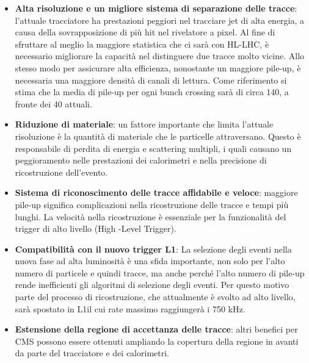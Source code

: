 \begin{itemize}
\item \textbf{Alta risoluzione e un migliore sistema di separazione delle tracce}: l'attuale tracciatore ha prestazioni peggiori nel tracciare jet di alta energia, a causa della sovrapposizione di più hit nel rivelatore a pixel. Al fine di sfruttare al meglio la maggiore statistica che ci sarà con HL-LHC, è necessario migliorare la capacità nel distinguere due tracce molto vicine. 
Allo stesso modo  per assicurare alta efficienza, nonostante un maggiore pile-up, è necessaria una maggiore densità di canali di lettura. Come riferimento si stima che la media di pile-up per ogni bunch crossing sarà di circa 140, a fronte dei 40 attuali.

\item \textbf{Riduzione di materiale}: un fattore importante che limita l'attuale risoluzione  è la quantità di materiale che le particelle attraversano. Questo è responsabile di perdita di energia e scattering multipli, i quali causano un peggioramento nelle prestazioni dei calorimetri e nella precisione di ricostruzione dell'evento.

\item \textbf{Sistema di riconoscimento delle tracce affidabile e veloce}: maggiore pile-up significa complicazioni nella ricostruzione delle tracce e tempi più lunghi. La velocità nella ricostruzione è essenziale per la funzionalità del trigger di alto livello (High -Level Trigger). 

\item \textbf{Compatibilità con il nuovo trigger L1}: La selezione degli eventi nella nuova fase ad alta luminosità è una sfida importante, non solo per l'alto numero di particele e quindi tracce, ma anche perché l'alto numero di pile-up rende inefficienti gli algoritmi di selezione degli eventi. Per questo motivo parte del processo di ricostruzione, che attualmente è svolto ad alto livello, sarà spostato in L1il cui rate massimo raggiungerà i 750 kHz.

\item \textbf{Estensione della regione di accettanza delle tracce}: altri benefici per CMS possono essere ottenuti ampliando la copertura della regione in avanti da parte del tracciatore e dei calorimetri.

 
\end{itemize}


